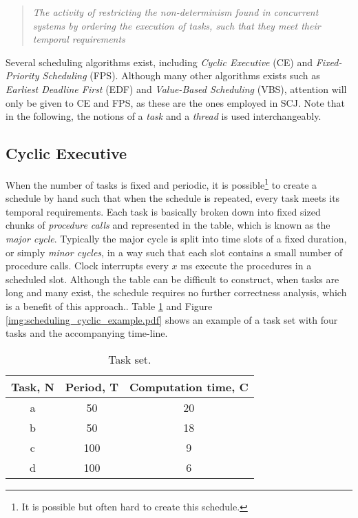 \begin{quotation}
	\textit{The activity of restricting the non-determinism found in concurrent systems by ordering the execution of tasks, such that they meet their temporal requirements}
\end{quotation}

Several scheduling algorithms exist, including \textit{Cyclic Executive} (CE) and \textit{Fixed-Priority Scheduling} (FPS). Although many other algorithms exists such as \textit{Earliest Deadline First} (EDF) and \textit{Value-Based Scheduling} (VBS), attention will only be given to CE and FPS, as these are the ones employed in SCJ. Note that in the following, the notions of a \textit{task} and a \textit{thread} is used interchangeably.

\subsection{Cyclic Executive}
\label{subsec:cyclicExecutive}
When the number of tasks is fixed and periodic, it is possible\footnote{It is possible but often hard to create this schedule.} to create a schedule by hand such that when the schedule is repeated, every task meets its temporal requirements. Each task is basically broken down into fixed sized chunks of \textit{procedure calls} and represented in the table, which is known as the \textit{major cycle}. Typically the major cycle is split into time slots of a fixed duration, or simply \textit{minor cycles}, in a way such that each slot contains a small number of procedure calls. Clock interrupts every $x$ ms execute the procedures in a scheduled slot. Although the table can be difficult to construct, when tasks are long and many exist, the schedule requires no further correctness analysis, which is a benefit of this approach.. Table \ref{table:CEtaskset} and Figure \ref{img:scheduling_cyclic_example.pdf} shows an example of a task set with four tasks and the accompanying time-line.

\begin{table}[ht]
\centering
\begin{tabular}{c c c}
\hline
Task, N & Period, T & Computation time, C \\ [0.5ex]
\hline 
a & 50  & 20 \\
b & 50  & 18 \\
c & 100 & 9  \\
d & 100 & 6  \\ [1ex]
\hline
\end{tabular}
\caption{Task set.}
\label{table:CEtaskset}
\end{table}


